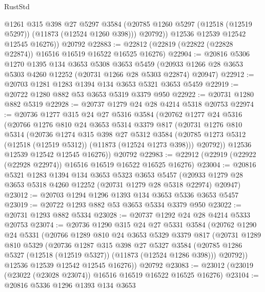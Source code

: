 \begin{lexlean}{RustStd}
\begin{coremodule}
            @1261
            @315
            @398
            @27
            @5297
            @3584
            (@20785 @1260 @5297 (@12518 (@12519 @5297)) (@11873 (@12524 @1260 @398)))
            @20792))
        @12536
        @12539
        @12542
        @12545
        @16276))
    @20792
@22883 := @22812 (@22819 (@22822 (@22828 @22874)) @16516 @16519 @16522 @16525 @16276)
@22904 := @20816
    @5306
    @1270
    @1395
    @134
    @3653
    @5308
    @3653
    @5459
    (@20933 @1266 @28 @3653 @5303 @4260 @12252 (@20731 @1266 @28 @5303 @22874) @20947)
@22912 := @20703 @1281 @1283 @1394 @134 @3653 @5321 @3653 @5459
@22919 := @20722 @1280 @882 @53 @3653 @5319 @3379 @950
@22922 := @20731 @1280 @882 @5319
@22928 := @20737 @1279 @24 @28 @4214 @5318 @20753
@22974 := @20736
    @1277
    @315
    @24
    @27
    @5316
    @3584
    (@20762
      @1277
      @24
      @5316
      (@20766
        @1276
        @810
        @24
        @3653
        @5314
        @3379
        @817
        (@20731
          @1276
          @810
          @5314
          (@20736
            @1274
            @315
            @398
            @27
            @5312
            @3584
            (@20785 @1273 @5312 (@12518 (@12519 @5312)) (@11873 (@12524 @1273 @398)))
            @20792))
        @12536
        @12539
        @12542
        @12545
        @16276))
    @20792
@22983 := @22912 (@22919 (@22922 (@22928 @22974)) @16516 @16519 @16522 @16525 @16276)
@23004 := @20816
    @5321
    @1283
    @1394
    @134
    @3653
    @5323
    @3653
    @5457
    (@20933 @1279 @28 @3653 @5318 @4260 @12252 (@20731 @1279 @28 @5318 @22974) @20947)
@23012 := @20703 @1294 @1296 @1393 @134 @3653 @5336 @3653 @5457
@23019 := @20722 @1293 @882 @53 @3653 @5334 @3379 @950
@23022 := @20731 @1293 @882 @5334
@23028 := @20737 @1292 @24 @28 @4214 @5333 @20753
@23074 := @20736
    @1290
    @315
    @24
    @27
    @5331
    @3584
    (@20762
      @1290
      @24
      @5331
      (@20766
        @1289
        @810
        @24
        @3653
        @5329
        @3379
        @817
        (@20731
          @1289
          @810
          @5329
          (@20736
            @1287
            @315
            @398
            @27
            @5327
            @3584
            (@20785 @1286 @5327 (@12518 (@12519 @5327)) (@11873 (@12524 @1286 @398)))
            @20792))
        @12536
        @12539
        @12542
        @12545
        @16276))
    @20792
@23083 := @23012 (@23019 (@23022 (@23028 @23074)) @16516 @16519 @16522 @16525 @16276)
@23104 := @20816
    @5336
    @1296
    @1393
    @134
    @3653

\end{coremodule}
\end{lexlean}
